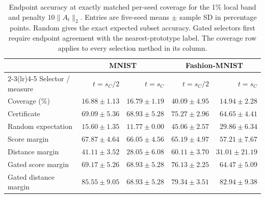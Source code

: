 \begin{table}[!htbp]
\centering\small
\caption{Endpoint accuracy at exactly matched per-seed coverage for the 1\% local band and penalty $10\|A_t\|_2$. Entries are five-seed means $\pm$ sample SD in percentage points. Random gives the exact expected subset accuracy. Gated selectors first require endpoint agreement with the nearest-prototype label. The coverage row applies to every selection method in its column.}
\label{tab:r3-selectors}
\begin{tabular}{@{}lrrrr@{}}
\toprule
 & \multicolumn{2}{c}{MNIST} & \multicolumn{2}{c}{Fashion-MNIST}\\
\cmidrule(lr){2-3}\cmidrule(lr){4-5}
Selector / measure & $t=s_C/2$ & $t=s_C$ & $t=s_C/2$ & $t=s_C$\\
\midrule
Coverage (\%) & $16.88\pm1.13$ & $16.79\pm1.19$ & $40.09\pm4.95$ & $14.94\pm2.28$\\
Certificate & $69.09\pm5.36$ & $68.93\pm5.28$ & $75.27\pm2.96$ & $64.65\pm4.41$\\
Random expectation & $15.60\pm1.35$ & $11.77\pm0.00$ & $45.06\pm2.57$ & $29.86\pm6.34$\\
Score margin & $67.87\pm4.64$ & $66.05\pm4.56$ & $65.19\pm4.97$ & $57.21\pm7.67$\\
Distance margin & $41.11\pm3.52$ & $28.05\pm6.08$ & $60.11\pm3.70$ & $31.01\pm21.19$\\
Gated score margin & $69.17\pm5.26$ & $68.93\pm5.28$ & $76.13\pm2.25$ & $64.47\pm5.09$\\
Gated distance margin & $85.55\pm9.05$ & $68.93\pm5.28$ & $79.34\pm3.51$ & $82.94\pm9.38$\\
\bottomrule
\end{tabular}
\end{table}
